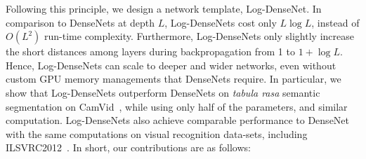 \documentclass{article}
\newcommand{\logdense}{Log-DenseNet\xspace}
\newcommand{\logdenses}{Log-DenseNets\xspace}
\newcommand{\pbdfull}{maximum backpropagation distance\xspace}
\newcommand{\pbd}{MBD\xspace}
\newcommand{\naive}{na\"{\i}ve\xspace}
\begin{document}




Following this principle, we design a network template, \logdense. In comparison to DenseNets at depth $L$, \logdenses cost only $L\log L$, instead of $O(L^2)$ run-time complexity. Furthermore, \logdenses only slightly increase the short distances among layers during backpropagation from 1 to $1 + \log L$. Hence, \logdenses can scale to deeper and wider networks, even without custom GPU memory managements that DenseNets require. In particular, we show that \logdenses outperform DenseNets on \textit{tabula rasa} semantic segmentation on CamVid~\citep{camvid-dataset}, while using only half of the parameters, and similar computation. \logdenses also achieve comparable performance to DenseNet with the same computations on visual recognition data-sets, including ILSVRC2012~\citep{ilsvrc}. In short, our contributions are as follows:
\end{document}
